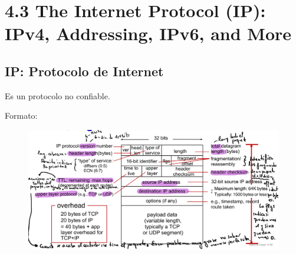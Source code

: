 \documentclass[12pt, twoside, openright]{report} %
\begin{document}
\section{4.3 The Internet Protocol (IP): IPv4, Addressing, IPv6, and More}
\subsection{IP: Protocolo de Internet}

Es un protocolo no confiable.

Formato:
\begin{figure}[H]
	{\includegraphics[scale=.17]{Untitled 28.png}}
\end{figure}
\end{document}
